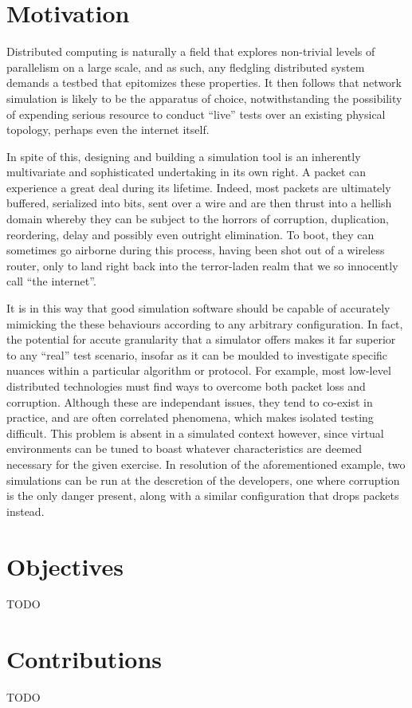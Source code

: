 \section{Motivation}

Distributed computing is naturally a field that explores non-trivial levels of parallelism on a large scale, and as
such, any fledgling distributed system demands a testbed that epitomizes these properties. It then follows that
network simulation is likely to be the apparatus of choice, notwithstanding the possibility of expending serious
resource to conduct ``live'' tests over an existing physical topology, perhaps even the internet itself.

In spite of this, designing and building a simulation tool is an inherently multivariate and sophisticated undertaking
in its own right. A packet can experience a great deal during its lifetime. Indeed, most packets are ultimately
buffered, serialized into bits, sent over a wire and are then thrust into a hellish domain whereby they can be
subject to the horrors of corruption, duplication, reordering, delay and possibly even outright elimination. To boot,
they can sometimes go airborne during this process, having been shot out of a wireless router, only to land right
back into the terror-laden realm that we so innocently call ``the internet''.

It is in this way that good simulation software should be capable of accurately mimicking the these behaviours
according to any arbitrary configuration. In fact, the potential for accute granularity that a simulator offers makes
it far superior to any ``real'' test scenario, insofar as it can be moulded to investigate specific nuances within a
particular algorithm or protocol. For example, most low-level distributed technologies must find ways to overcome
both packet loss and corruption. Although these are independant issues, they tend to co-exist in practice, and are
often correlated phenomena, which makes isolated testing difficult. This problem is absent in a simulated context
however, since virtual environments can be tuned to boast whatever characteristics are deemed necessary for
the given exercise. In resolution of the aforementioned example, two simulations can be run at the descretion of the
developers, one where corruption is the only danger present, along with a similar configuration that drops packets
instead.


\section{Objectives}

TODO


\section{Contributions}

TODO
